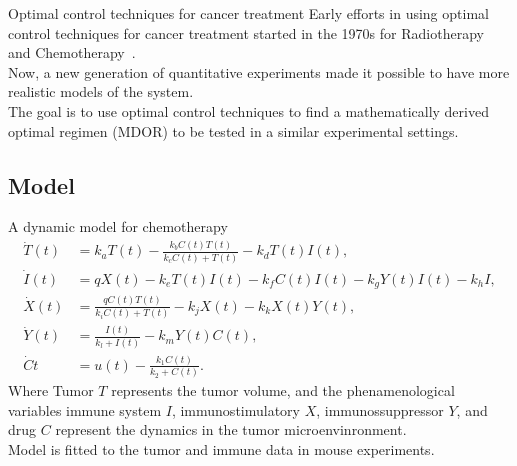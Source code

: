 \documentclass[10pt]{beamer}
\begin{document}
\begin{frame}{Optimal control techniques for cancer treatment}
	Early efforts in using optimal control techniques for cancer treatment started in the 1970s for Radiotherapy~ and Chemotherapy~. \\
	\vspace{0.5cm}
	Now, a new generation of quantitative experiments made it possible to have more realistic models of the system. \\
	\vspace{0.5cm}
	The goal is to use optimal control techniques to find a mathematically derived optimal regimen (MDOR) to be tested in a similar experimental settings.
\end{frame}

\subsection{Model}
\begin{frame}{A dynamic model for chemotherapy}
\small
\begin{subequations} \label{eq:chemo1}
	\begin{align} 
		\dot{T}(t) &=  k_{a} T(t) - \frac{k_{b}C(t)T(t)}{k_{c}C(t)+T(t)} - k_{d}T(t)I(t),\\
		\dot{I}(t) &= q X(t) -k_{e}T(t)I(t)-k_{f}C(t)I(t)-k_{g}Y(t)I(t)-k_{h}I,\\
		\dot{X}(t) &= \frac{q C(t)T(t)}{k_{i}C(t)+T(t)}-k_{j}X(t)-k_{k}X(t)Y(t),\\
		\dot{Y}(t) &= \frac{I(t)}{k_l+I(t)} - k_{m}Y(t) C(t),\\
		\dot{C}{t} &= u(t) - \frac{k_1 C(t)}{k_2 + C(t)}.
	\end{align}
\end{subequations}
Where Tumor $T$ represents the tumor volume, and the phenamenological variables immune system $I$, immunostimulatory $X$, immunossuppressor $Y$, and drug $C$ represent the dynamics in the tumor microenvinronment. \\
Model is fitted to the tumor and immune data in mouse experiments.
\end{frame}

%	
\end{document}

